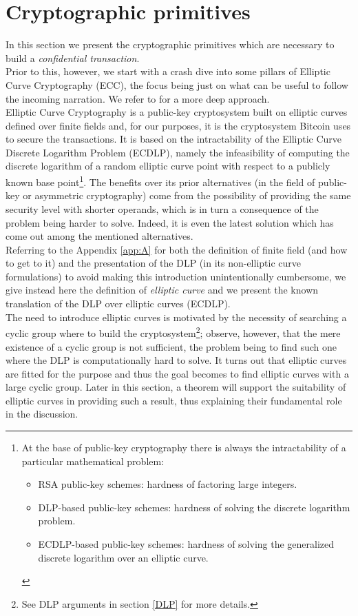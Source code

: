 \chapter{Cryptographic primitives}
\label{chpr:crypto_primitives}
In this section we present the cryptographic primitives which are necessary to build a \textit{confidential transaction}.\\
Prior to this, however, we start with a crash dive into some pillars of Elliptic Curve Cryptography (ECC), the focus being just on what can be useful to follow the incoming narration. We refer to \cite{Sec, UnderstandingCrypto} for a more deep approach.\\
Elliptic Curve Cryptography is a public-key cryptosystem built on elliptic curves defined over finite fields and, for our purposes, it is the cryptosystem Bitcoin uses to secure the transactions. It is based on the intractability of the Elliptic Curve Discrete Logarithm Problem (ECDLP), namely the infeasibility of computing the discrete logarithm of a random elliptic curve point with respect to a publicly known base point\footnote{At the base of public-key cryptography there is always the intractability of a particular mathematical problem: \begin{itemize} \item RSA public-key schemes: hardness of factoring large integers. \item DLP-based public-key schemes: hardness of solving the discrete logarithm problem. \item ECDLP-based public-key schemes: hardness of solving the generalized discrete logarithm over an elliptic curve. \end{itemize}}. The benefits over its prior alternatives (in the field of public-key or asymmetric cryptography) come from the possibility of providing the same security level with shorter operands, which is in turn a consequence of the problem being harder to solve. Indeed, it is even the latest solution which has come out among the mentioned alternatives.\\
Referring to the Appendix \ref{app:A} for both the definition of finite field (and how to get to it) and the presentation of the DLP (in its non-elliptic curve formulations) to avoid making this introduction unintentionally cumbersome, we give instead here the definition of \textit{elliptic curve} and we present the known translation of the DLP over elliptic curves (ECDLP).\\ 
The need to introduce elliptic curves is motivated by the necessity of searching a cyclic group where to build the cryptosystem\footnote{See DLP arguments in section \ref{DLP} for more details.}; observe, however, that the mere existence of a cyclic group is not sufficient, the problem being to find such one where the DLP is computationally hard to solve. It turns out that elliptic curves are fitted for the purpose and thus the goal becomes to find elliptic curves with a large cyclic group. Later in this section, a theorem will support the suitability of elliptic curves in providing such a result, thus explaining their fundamental role in the discussion.\\
